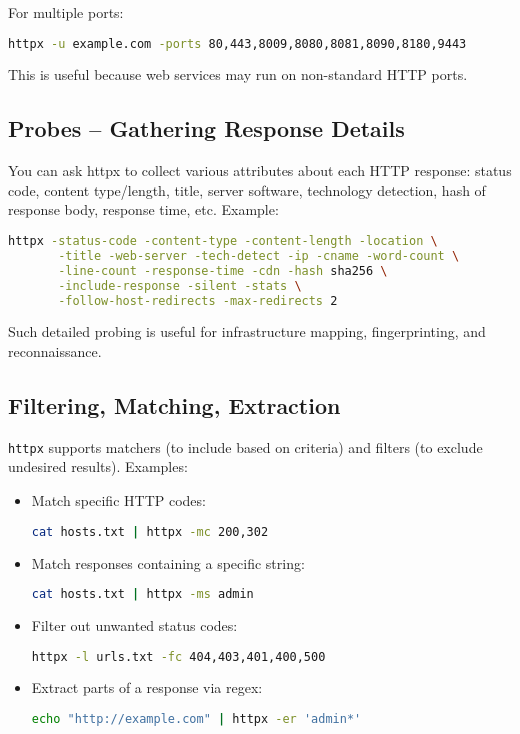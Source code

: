 \documentclass[11pt,a4paper]{article}
\begin{document}
For multiple ports:  
\begin{lstlisting}[language=bash]
httpx -u example.com -ports 80,443,8009,8080,8081,8090,8180,9443
\end{lstlisting}
This is useful because web services may run on non-standard HTTP ports. 

\subsection*{Probes – Gathering Response Details}
You can ask httpx to collect various attributes about each HTTP response: status code, content type/length, title, server software, technology detection, hash of response body, response time, etc.  
Example:  
\begin{lstlisting}[language=bash]
httpx -status-code -content-type -content-length -location \
       -title -web-server -tech-detect -ip -cname -word-count \
       -line-count -response-time -cdn -hash sha256 \
       -include-response -silent -stats \
       -follow-host-redirects -max-redirects 2
\end{lstlisting}

Such detailed probing is useful for infrastructure mapping, fingerprinting, and reconnaissance.

\subsection*{Filtering, Matching, Extraction}
\texttt{httpx} supports matchers (to include based on criteria) and filters (to exclude undesired results). Examples:  
\begin{itemize}
  \item Match specific HTTP codes:  
\begin{lstlisting}[language=bash]
cat hosts.txt | httpx -mc 200,302
\end{lstlisting}

  \item Match responses containing a specific string:  
\begin{lstlisting}[language=bash]
cat hosts.txt | httpx -ms admin
\end{lstlisting}

  \item Filter out unwanted status codes:  
\begin{lstlisting}[language=bash]
httpx -l urls.txt -fc 404,403,401,400,500
\end{lstlisting}

  \item Extract parts of a response via regex:  
\begin{lstlisting}[language=bash]
echo "http://example.com" | httpx -er 'admin*'
\end{lstlisting}
 
\end{itemize}
\end{document}

